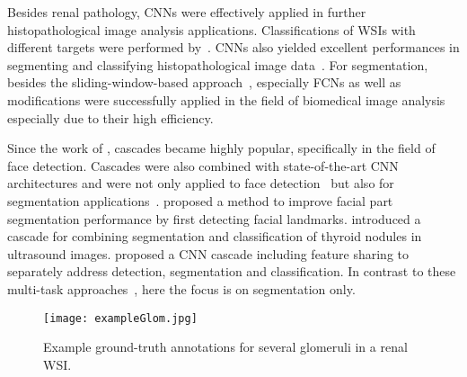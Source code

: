 \documentclass{elsarticle}
\begin{document}
Besides renal pathology, CNNs were effectively applied in further histopathological image analysis applications. Classifications of WSIs with different targets were performed by~\cite{myBarker16a,myHou16a,mySertel09a}.
CNNs also yielded excellent performances in segmenting and classifying histopathological image data~\citep{myBenTaieb16a,myVeta16a}.
%
For segmentation, besides the sliding-window-based approach~\citep{NIPS2012_4741}, especially FCNs as well as modifications were successfully applied in the field of biomedical image analysis~\citep{myBenTaieb16a,myRonneberger15a} especially due to their high efficiency.

Since the work of \cite{myViola01a}, cascades became highly popular, specifically in the field of face detection.
Cascades were also combined with state-of-the-art CNN architectures and were not only applied to face detection~\citep{myLi15c} but also for segmentation applications~\citep{myDai16a,myJackson16a,myMa17a}.
\cite{myJackson16a} proposed a method to improve facial part segmentation performance by first detecting facial landmarks. 
\cite{myMa17a} introduced a cascade for combining segmentation and classification of thyroid nodules in ultrasound images.
\cite{myDai16a} proposed a CNN cascade including feature sharing to separately address detection, segmentation and classification.
In contrast to these multi-task approaches~\citep{myDai16a,myJackson16a,myMa17a}, here the focus is on segmentation only.

% 


\begin{figure}[bt]
	\centering
	\texttt{[image: exampleGlom.jpg]}
	\caption{Example ground-truth annotations for several glomeruli in a renal WSI.}
	\label{fig:example2}
\end{figure}






\end{document}
